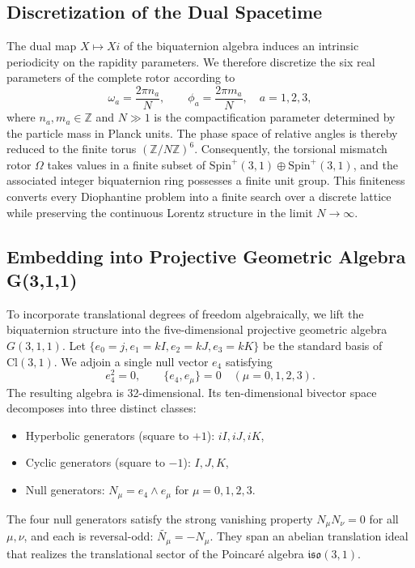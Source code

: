 \documentclass[dvipdfmx,a4paper]{article}
\theoremstyle{definition}
\theoremstyle{remark}
\begin{document}
\subsection{Discretization of the Dual Spacetime}

The dual map \( X \mapsto Xi \) of the biquaternion algebra induces an intrinsic periodicity on the rapidity parameters. We therefore discretize the six real parameters of the complete rotor according to
\[
\omega_a = \frac{2\pi n_a}{N}, \qquad \phi_a = \frac{2\pi m_a}{N}, \quad a=1,2,3,
\]
where \( n_a, m_a \in \mathbb{Z} \) and \( N \gg 1 \) is the compactification parameter determined by the particle mass in Planck units. The phase space of relative angles is thereby reduced to the finite torus \( (\mathbb{Z}/N\mathbb{Z})^6 \). Consequently, the torsional mismatch rotor \( \Omega \) takes values in a finite subset of \( \mathrm{Spin}^+(3,1) \oplus \mathrm{Spin}^+(3,1) \), and the associated integer biquaternion ring possesses a finite unit group. This finiteness converts every Diophantine problem into a finite search over a discrete lattice while preserving the continuous Lorentz structure in the limit \( N \to \infty \).

\subsection{Embedding into Projective Geometric Algebra G(3,1,1)}

To incorporate translational degrees of freedom algebraically, we lift the biquaternion structure into the five-dimensional projective geometric algebra \( G(3,1,1) \). Let \( \{e_0 = j, e_1 = kI, e_2 = kJ, e_3 = kK\} \) be the standard basis of \( \mathrm{Cl}(3,1) \). We adjoin a single null vector \( e_4 \) satisfying
\[
e_4^2 = 0, \qquad \{e_4, e_\mu\} = 0 \quad (\mu = 0,1,2,3).
\]
The resulting algebra is 32-dimensional. Its ten-dimensional bivector space decomposes into three distinct classes:
\begin{itemize}
  \item Hyperbolic generators (square to \( +1 \)): \( iI, iJ, iK \),
  \item Cyclic generators (square to \( -1 \)): \( I, J, K \),
  \item Null generators: \( N_\mu = e_4 \wedge e_\mu \) for \( \mu = 0,1,2,3 \).
\end{itemize}
The four null generators satisfy the strong vanishing property \( N_\mu N_\nu = 0 \) for all \( \mu,\nu \), and each is reversal-odd: \( \widetilde{N_\mu} = -N_\mu \). They span an abelian translation ideal that realizes the translational sector of the Poincaré algebra \( \mathfrak{iso}(3,1) \).
\end{document}
